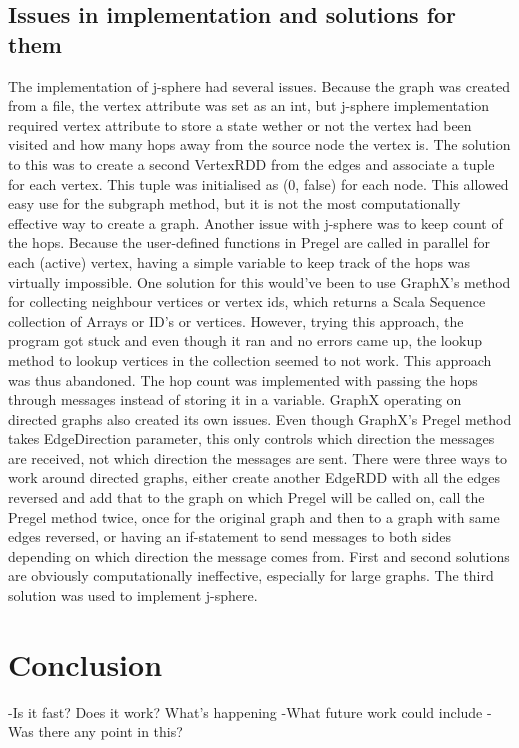 \documentclass{article}
\theoremstyle{definition}
\begin{document}
\subsection{Issues in implementation and solutions for them}
The implementation of j-sphere had several issues. Because the graph was created from a file, the vertex attribute was set as an int, but j-sphere implementation required vertex attribute to store a state wether or not the vertex had been visited and how many hops away from the source node the vertex is. The solution to this was to create a second VertexRDD from the edges and associate a tuple for each vertex. This tuple was initialised as (0, false) for each node. This allowed easy use for the subgraph method, but it is not the most computationally effective way to create a graph. 
Another issue with j-sphere was to keep count of the hops. Because the user-defined functions in Pregel are called in parallel for each (active) vertex, having a simple variable to keep track of the hops was virtually impossible. One solution for this would've been to use GraphX's method for collecting neighbour vertices or vertex ids, which returns a Scala Sequence collection of Arrays or ID's or vertices. However, trying this approach, the program got stuck and even though it ran and no errors came up, the lookup method to lookup vertices in the collection seemed to not work. This approach was thus abandoned. The hop count was implemented with passing the hops through messages instead of storing it in a variable. 
GraphX operating on directed graphs also created its own issues. Even though GraphX's Pregel method takes EdgeDirection parameter, this only controls which direction the messages are received, not which direction the messages are sent. There were three ways to work around directed graphs, either create another EdgeRDD with all the edges reversed and add that to the graph on which Pregel will be called on, call the Pregel method twice, once for the original graph and then to a graph with same edges reversed, or having an if-statement to send messages to both sides depending on which direction the message comes from. First and second solutions are obviously computationally ineffective, especially for large graphs. The third solution was used to implement j-sphere.




\section{Conclusion}
-Is it fast? Does it work? What's happening
-What future work could include
-Was there any point in this? 
\end{document}
